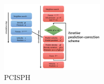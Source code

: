 \begin{multicols}{2}
\begin{figure}[H]
	\centering
	\includegraphics[width=0.45\textwidth]{img/05_pcisph}
	\caption{PCISPH}
\end{figure}
%
%


 


\end{multicols}